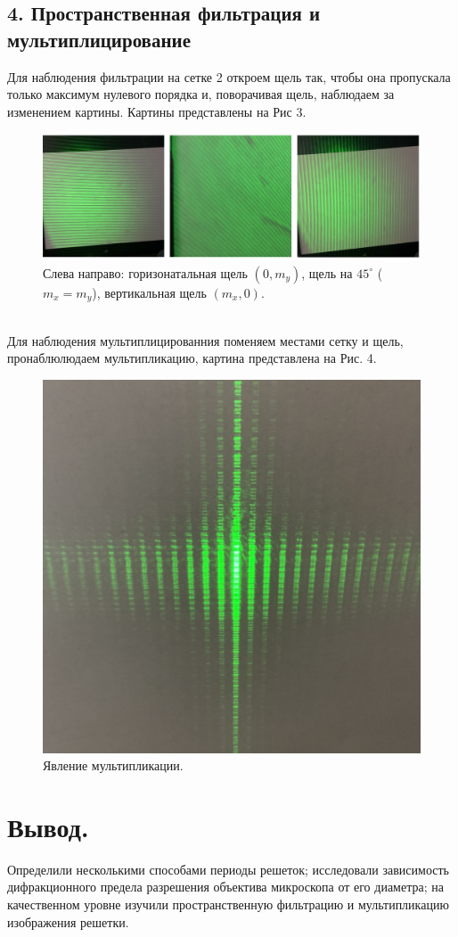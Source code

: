 \documentclass[a4paper,12pt]{article} %
\begin{document}
\subsection{4. Пространственная фильтрация и мультиплицирование}
Для наблюдения фильтрации на сетке 2 откроем щель так, чтобы она пропускала только максимум нулевого порядка и, поворачивая щель, наблюдаем за изменением картины. Картины представлены на Рис 3.
\begin{figure}[h]
\includegraphics[scale=0.5]{3.png}
\centering
\caption{Слева направо: горизонатальная щель $(0,m_y)$, щель на $45^\circ$ ($m_x = m_y$), вертикальная щель $(m_x,0)$.}
\end{figure}\\
Для наблюдения мультиплицированния поменяем местами сетку и щель, пронаблюлюдаем мультипликацию, картина представлена на Рис. 4.
\begin{figure}[h]
\includegraphics[scale=0.7]{4.png}
\centering
\caption{Явление мультипликации.}
\end{figure}

\section{Вывод.}

Определили несколькими способами периоды решеток; исследовали зависимость дифракционного предела разрешения объектива микроскопа от его диаметра; на качественном уровне изучили пространственную фильтрацию и мультипликацию изображения решетки.
\end{document}
